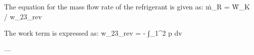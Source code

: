 The equation for the mass flow rate of the refrigerant is given as:  
ṁ_R = Ẇ_K / w_23_rev  

The work term is expressed as:  
w_23_rev = - ∫_1^2 p dv  

---